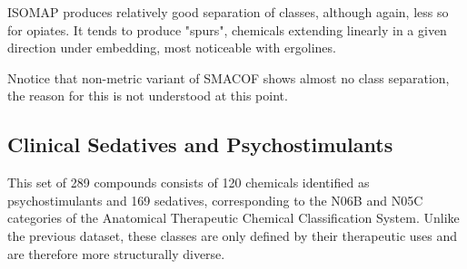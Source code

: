 \documentclass[12pt]{article}
\begin{document}
ISOMAP produces relatively good separation of classes, although again, less so for opiates. It tends to produce "spurs", chemicals extending linearly in a given direction under embedding, most noticeable with ergolines. 

Nnotice that non-metric variant of SMACOF shows almost no class separation, the reason for this is not understood at this point.

\subsection{Clinical Sedatives and Psychostimulants}
This set of 289 compounds consists of 120 chemicals identified as psychostimulants and 169 sedatives, corresponding to the N06B and N05C categories of the Anatomical Therapeutic Chemical Classification System. Unlike the previous dataset, these classes are only defined by their therapeutic uses and are therefore more structurally diverse.
\end{document}
